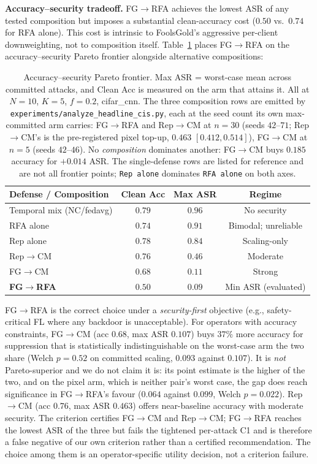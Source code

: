 \documentclass{article}
\begin{document}
\textbf{Accuracy--security tradeoff.} FG$\to$RFA achieves the lowest ASR of any tested composition but imposes a substantial clean-accuracy cost ($0.50$ vs.\ $0.74$ for RFA alone). This cost is intrinsic to FoolsGold's aggressive per-client downweighting, not to composition itself. Table~\ref{tab:pareto} places FG$\to$RFA on the accuracy--security Pareto frontier alongside alternative compositions:

\begin{table}[h]
\caption{Accuracy--security Pareto frontier. Max ASR = worst-case mean across committed attacks, and Clean Acc is measured on the arm that attains it. All at $N{=}10$, $K{=}5$, $f{=}0.2$, cifar\_cnn. The three composition rows are emitted by \texttt{experiments/analyze\_headline\_cis.py}, each at the seed count its own max-committed arm carries: FG$\to$RFA and Rep$\to$CM at $n{=}30$ (seeds $42$--$71$; Rep$\to$CM's is the pre-registered pixel top-up, $0.463$ $[0.412,0.514]$), FG$\to$CM at $n{=}5$ (seeds $42$--$46$). No \emph{composition} dominates another: FG$\to$CM buys $0.185$ accuracy for $+0.014$ ASR. The single-defense rows are listed for reference and are not all frontier points; \texttt{Rep alone} dominates \texttt{RFA alone} on both axes.}
\label{tab:pareto}
\centering\small
\begin{tabular}{lccc}
\toprule
\textbf{Defense / Composition} & \textbf{Clean Acc} & \textbf{Max ASR} & \textbf{Regime} \\
\midrule
Temporal mix (NC/fedavg) & $0.79$ & $0.96$ & No security \\
RFA alone & $0.74$ & $0.91$ & Bimodal; unreliable \\
Rep alone & $0.78$ & $0.84$ & Scaling-only \\
Rep$\to$CM & $0.76$ & $0.46$ & Moderate \\
FG$\to$CM & $0.68$ & $0.11$ & Strong \\
\textbf{FG$\to$RFA} & $\mathbf{0.50}$ & $\mathbf{0.09}$ & Min ASR (evaluated) \\
\bottomrule
\end{tabular}
\end{table}

\noindent FG$\to$RFA is the correct choice under a \emph{security-first} objective (e.g., safety-critical FL where any backdoor is unacceptable). For operators with accuracy constraints, FG$\to$CM (acc $0.68$, max ASR $0.107$) buys $37\%$ more accuracy for suppression that is statistically indistinguishable on the worst-case arm the two share (Welch $p = 0.52$ on committed scaling, $0.093$ against $0.107$). It is \emph{not} Pareto-superior and we do not claim it is: its point estimate is the higher of the two, and on the pixel arm, which is neither pair's worst case, the gap does reach significance in FG$\to$RFA's favour ($0.064$ against $0.099$, Welch $p = 0.022$). Rep$\to$CM (acc $0.76$, max ASR $0.463$) offers near-baseline accuracy with moderate security. The criterion certifies FG$\to$CM and Rep$\to$CM; FG$\to$RFA reaches the lowest ASR of the three but fails the tightened per-attack C1 and is therefore a false negative of our own criterion rather than a certified recommendation. The choice among them is an operator-specific utility decision, not a criterion failure.
\end{document}
